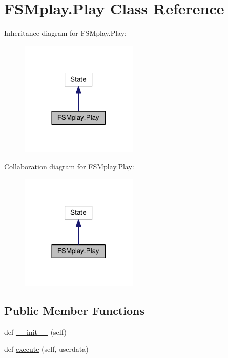 \hypertarget{classFSMplay_1_1Play}{}\section{F\+S\+Mplay.\+Play Class Reference}
\label{classFSMplay_1_1Play}


Inheritance diagram for F\+S\+Mplay.\+Play\+:\nopagebreak
\begin{figure}[H]
\begin{center}
\leavevmode
\includegraphics[width=158pt]{classFSMplay_1_1Play__inherit__graph}
\end{center}
\end{figure}


Collaboration diagram for F\+S\+Mplay.\+Play\+:\nopagebreak
\begin{figure}[H]
\begin{center}
\leavevmode
\includegraphics[width=158pt]{classFSMplay_1_1Play__coll__graph}
\end{center}
\end{figure}
\subsection*{Public Member Functions}
\begin{DoxyCompactItemize}
\item 
def \hyperlink{classFSMplay_1_1Play_a9f4e0fb04109cac88a2f0f498b7c3b55}{\+\_\+\+\_\+init\+\_\+\+\_\+} (self)
\item 
def \hyperlink{classFSMplay_1_1Play_a699a762c4344fc54a6fc97a20c0f604d}{execute} (self, userdata)
\end{DoxyCompactItemize}
